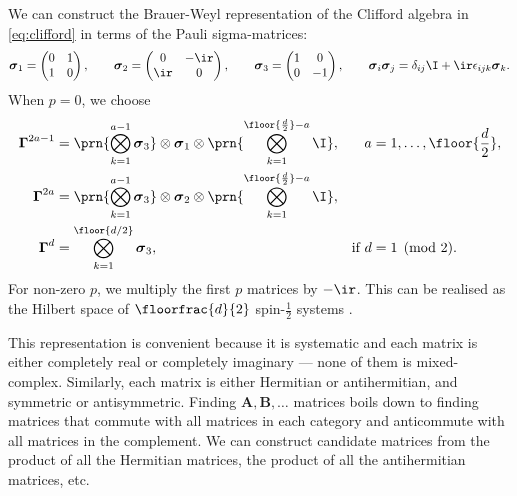 \documentclass[11pt]{article}
\newcommand{\Gammab}{\boldsymbol{\Gamma}}
\newcommand{\A}{\mathbf{A}}
\newcommand{\B}{\mathbf{B}}
\newcommand{\sigmab}{\boldsymbol{\sigma}}
\begin{document}
We can construct the Brauer-Weyl representation \cite{brauer1935spinors} of the Clifford algebra in \cref{eq:clifford} in terms of the Pauli sigma-matrices:
%
\begin{equation}\label{eq:paulisigma}
  \sigmab_1 = \begin{pmatrix}
                0 & 1 \\
                1 & 0 \\
              \end{pmatrix}
  , \qquad
  \sigmab_2 = \begin{pmatrix}
                0   & -\ir \\
                \ir & 0    \\
              \end{pmatrix}
  , \qquad
  \sigmab_3 = \begin{pmatrix}
                1 & 0  \\
                0 & -1 \\
              \end{pmatrix}
  , \qquad
  \sigmab_i \sigmab_j = \delta_{ij} \I + \ir \epsilon_{ijk} \sigmab_k.
\end{equation}
%
When $p=0$, we choose
%
\begin{equation}\label{eq:explicit}
\begin{aligned}
  \Gammab^{2a-1} &= \prn{\bigotimes_{k=1}^{a-1} \sigmab_3}
                    \otimes \sigmab_1 \otimes
                    \prn{\bigotimes_{k=1}^{\floor{\frac{d}{2}}-a} \I}, &
    a &= 1, \ldots, \floor{\frac{d}{2}}, \\
  \Gammab^{2a} &= \prn{\bigotimes_{k=1}^{a-1} \sigmab_3}
                  \otimes \sigmab_2 \otimes
                  \prn{\bigotimes_{k=1}^{\floor{\frac{d}{2}}-a} \I}, \\
  \Gammab^d &= \bigotimes_{k=1}^{\floor{d/2}} \sigmab_3, &
    \text{if }
    d &= 1 \pmod 2.
\end{aligned}
\end{equation}
%
For non-zero $p$, we multiply the first $p$ matrices by $-\ir$.
This can be realised as the Hilbert space of $\floorfrac{d}{2}$ spin-$\frac{1}{2}$ systems
\cite{Strathdee:1987jr,strathdee1986extended}.

This representation is convenient because it is systematic and each matrix is either completely real or completely imaginary --- none of them is mixed-complex.
Similarly, each matrix is either Hermitian or antihermitian, and symmetric or antisymmetric.
Finding $\A, \B, \dots$ matrices boils down to finding matrices that commute with all matrices in each category and anticommute with all matrices in the complement.
We can construct candidate matrices from the product of all the Hermitian matrices, the product of all the antihermitian matrices, etc.
\end{document}
